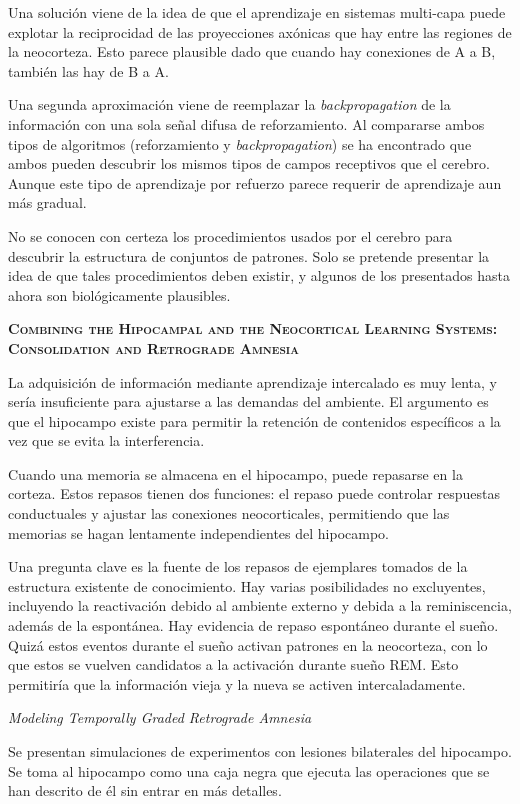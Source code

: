 \documentclass[a4paper,12pt]{article}
\begin{document}
Una solución viene de la idea de que el aprendizaje en sistemas multi-capa puede explotar la reciprocidad de las proyecciones axónicas que hay entre las regiones de la neocorteza. Esto parece plausible dado que cuando hay conexiones de A a B, también las hay de B a A. 

Una segunda aproximación viene de reemplazar la {\itshape backpropagation} de la información con una sola señal difusa de reforzamiento. Al compararse ambos tipos de algoritmos (reforzamiento y {\itshape backpropagation}) se ha encontrado que ambos pueden descubrir los mismos tipos de campos receptivos que el cerebro. Aunque este tipo de aprendizaje por refuerzo parece requerir de aprendizaje aun más gradual.

No se conocen con certeza los procedimientos usados por el cerebro para descubrir la estructura de conjuntos de patrones. Solo se pretende presentar la idea de que tales procedimientos deben existir, y algunos de los presentados hasta ahora son biológicamente plausibles. 

{\scshape\bfseries Combining the Hipocampal and the Neocortical Learning Systems: Consolidation and Retrograde Amnesia}

La adquisición de información mediante aprendizaje intercalado es muy lenta, y sería insuficiente para ajustarse a las demandas del ambiente. El argumento es que el hipocampo existe para permitir la retención de contenidos específicos a la vez que se evita la interferencia. 

Cuando una memoria se almacena en el hipocampo, puede repasarse en la corteza. Estos repasos tienen dos funciones: el repaso puede controlar respuestas conductuales y ajustar las conexiones neocorticales, permitiendo que las memorias se hagan lentamente independientes del hipocampo.

Una pregunta clave es la fuente de los repasos de ejemplares tomados de la estructura existente de conocimiento. Hay varias posibilidades no excluyentes, incluyendo la reactivación debido al ambiente externo y debida a la reminiscencia, además de la espontánea. Hay evidencia de repaso espontáneo durante el sueño. Quizá estos eventos durante el sueño activan patrones en la neocorteza, con lo que estos se vuelven candidatos a la activación durante sueño REM. Esto permitiría que la información vieja y la nueva se activen intercaladamente.

{\itshape Modeling Temporally Graded Retrograde Amnesia}

Se presentan simulaciones de experimentos con lesiones bilaterales del hipocampo. Se toma al hipocampo como una caja negra que ejecuta las operaciones que se han descrito de él sin entrar en más detalles.
\end{document}
